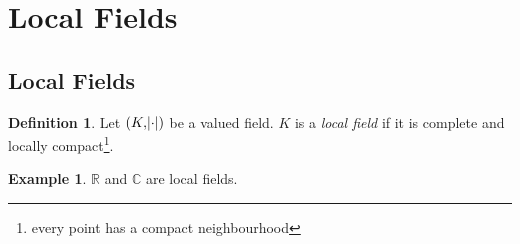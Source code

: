 \documentclass[11pt]{article}
\theoremstyle{definition}
\newtheorem{definition}{Definition}[subsection]
\newtheorem*{example}{Example}
\theoremstyle{plain}
\theoremstyle{remark}
\newcommand{\RR}{\mathbb{R}}
\newcommand{\CC}{\mathbb{C}}
\begin{document}
\section{Local Fields}

\subsection{Local Fields}

\begin{definition}\label{def:7_1}
    Let $(K, \abs{\cdot})$ be a valued field. $K$ is a \emph{local field} if it is complete and locally compact\footnote{every point has a compact neighbourhood}.
\end{definition}

\begin{example}
    $\RR$ and $\CC$ are local fields.
\end{example}
\end{document}
